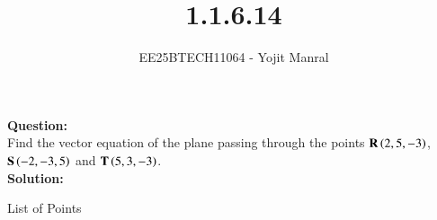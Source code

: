 \documentclass[journal]{IEEEtran}
\begin{document}

\vspace{3cm}

\title{1.1.6.14}
\author{EE25BTECH11064 - Yojit Manral}

\maketitle
{\let\newpage\relax\maketitle}
\renewcommand{\thefigure}{\theenumi}
\renewcommand{\thetable}{\theenumi}
\setlength{\intextsep}{10pt} %

\textbf{Question:}\\
Find the vector equation of the plane passing through the points $\mathbf{R}\left(2, 5, -3\right)$, $\mathbf{S}\left(-2, -3, 5\right)$ and $\mathbf{T}\left(5, 3, -3\right)$.\\

\textbf{Solution:}\\
\begin{table}[h!]    
  \centering
  
  \caption{List of Points}
  \label{Table_1}
\end{table}\\
\end{document}
